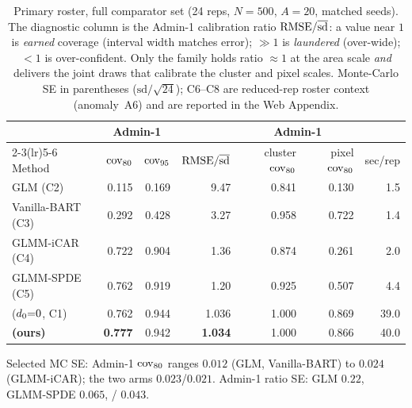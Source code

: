 \begin{table}[t]
\centering
\small
\caption{Primary roster, full comparator set (24 reps, $N=500$, $A=20$, matched
seeds). The diagnostic column is the Admin-1 calibration ratio
$\mathrm{RMSE}/\overline{\mathrm{sd}}$: a value near $1$ is \emph{earned} coverage (interval width matches error);
$\gg1$ is \emph{laundered} (over-wide); $<1$ is over-confident. Only the
\bartsimp{} family holds ratio $\approx1$ at the area scale \emph{and} delivers the
joint draws that calibrate the cluster and pixel scales. Monte-Carlo SE in
parentheses ($\mathrm{sd}/\sqrt{24}$); C6--C8 are reduced-rep roster context
(anomaly~A6) and are reported in the Web Appendix.}
\label{tab:primary}
\begin{tabular}{l rr r rr r}
\toprule
& \multicolumn{2}{c}{Admin-1} & & \multicolumn{2}{c}{Admin-1} & \\
\cmidrule(lr){2-3}\cmidrule(lr){5-6}
Method & $\mathrm{cov}_{80}$ & $\mathrm{cov}_{95}$ & $\mathrm{RMSE}/\overline{\mathrm{sd}}$ & cluster $\mathrm{cov}_{80}$ & pixel $\mathrm{cov}_{80}$ & sec/rep \\
\midrule
GLM (C2)            & 0.115 & 0.169 & 9.47 & 0.841 & 0.130 & 1.5 \\
Vanilla-BART (C3)   & 0.292 & 0.428 & 3.27 & 0.958 & 0.722 & 1.4 \\
GLMM-iCAR (C4)      & 0.722 & 0.904 & 1.36 & 0.874 & 0.261 & 2.0 \\
GLMM-SPDE (C5)      & 0.762 & 0.919 & 1.20 & 0.925 & 0.507 & 4.4 \\
\midrule
\bartsimp{} ($d_0{=}0$, C1) & 0.762 & 0.944 & 1.036 & 1.000 & 0.869 & 39.0 \\
\textbf{\bartsimpsd{} (ours)} & \textbf{0.777} & 0.942 & \textbf{1.034} & 1.000 & 0.866 & 40.0 \\
\bottomrule
\end{tabular}

\vspace{2pt}
{\footnotesize Selected MC SE: Admin-1 $\mathrm{cov}_{80}$ ranges $0.012$ (GLM, Vanilla-BART)
to $0.024$ (GLMM-iCAR); the two \bartsimp{} arms $0.023$/$0.021$. Admin-1 ratio SE:
GLM $0.22$, GLMM-SPDE $0.065$, \bartsimp{}/\bartsimpsd{} $0.043$.}
\end{table}
